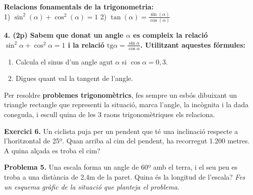 \documentclass[12pt,a4paper]{article}
\begin{document}
\begin{center}
\end{center}
\vspace{3cm}

\begin{capsula}
\textbf{Relacions fonamentals de la trigonometria:} \\
1) $\sin^2(\alpha) + \cos^2(\alpha) = 1$ \hspace{1cm} 2) $\tan(\alpha) = \frac{\sin(\alpha)}{\cos(\alpha)}$
\end{capsula}

\textbf{4. (2p) Sabem que donat un angle $\alpha$ es compleix la relació $\sin^2\alpha + \cos^2\alpha = 1$ i la relació $\text{tg}\alpha = \frac{\sin\alpha}{\cos\alpha}$. Utilitzant aquestes fórmules:}
\begin{enumerate}[label=\alph*)]
    \item Calcula el sinus d’un angle agut $\alpha$ si $\cos\alpha = 0,3$. \vspace{2cm}
    \item Digues quant val la tangent de l’angle. \vspace{2cm}
\end{enumerate}

\begin{capsula}
Per resoldre \textbf{problemes trigonomètrics}, fes sempre un esbós dibuixant un triangle rectangle que representi la situació, marca l'angle, la incògnita i la dada coneguda, i escull quina de les 3 raons trigonomètriques els relaciona.
\end{capsula}

\textbf{Exercici 6.} Un ciclista puja per un pendent que té una inclinació respecte a l’horitzontal de 25º. Quan arriba al cim del pendent, ha recorregut 1.200 metres. A quina alçada es troba el cim? \vspace{4cm}

\textbf{Problema 5.} Una escala forma un angle de 60º amb el terra, i el seu peu es troba a una distància de 2,4m de la paret. Quina és la longitud de l’escala? \textit{Fes un esquema gràfic de la situació que planteja el problema.} \vspace{4cm}
\end{document}
